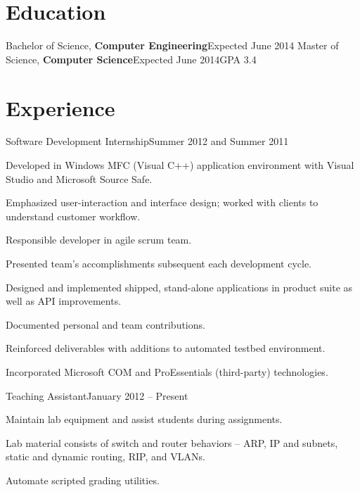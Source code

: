 \documentclass[margin,line,oneside,a4paper]{resume}
\begin{document}
\begin{resume}


   \createContactInformation


   \section{\mysidestyle Education}

   {Bachelor of Science, \textbf{Computer Engineering}}{Expected June 2014}%
   {Master of Science, \textbf{Computer Science}}{Expected June 2014}{GPA 3.4}

   \section{\mysidestyle Experience}

   {Software Development Internship}{Summer 2012 and Summer 2011}
   \begin{list2}
   \item Developed in Windows MFC (Visual C++) application environment with Visual Studio and Microsoft Source Safe.
   \item Emphasized user-interaction and interface design; worked with clients to understand customer workflow.
   \item Responsible developer in agile scrum team. 
   \item Presented team's accomplishments subsequent each development cycle.
   \item Designed and implemented shipped, stand-alone applications in product suite as well as API improvements.
   \item Documented personal and team contributions.
   \item Reinforced deliverables with additions to automated testbed environment.
   \item Incorporated Microsoft COM and ProEssentials (third-party) technologies.
   \end{list2}

   {Teaching Assistant}{January 2012 -- Present}
   \begin{list2}
   \item Maintain lab equipment and assist students during assignments.
   \item Lab material consists of switch and router behaviors -- ARP, IP and subnets, static and dynamic routing, RIP, and VLANs.
   \item Automate scripted grading utilities.
   \end{list2}



\end{resume}
\end{document}
